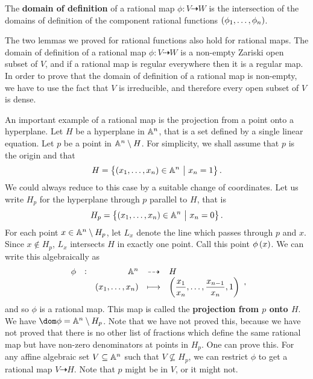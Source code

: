 \begin{definition*}
The \textbf{domain of definition} of a rational map $ \phi : V \dashrightarrow W $ is the intersection of the domains of definition of the component rational functions $ \br{\phi_1, \dots, \phi_n} $.
\end{definition*}

The two lemmas we proved for rational functions also hold for rational maps. The domain of definition of a rational map $ \phi : V \dashrightarrow W $ is a non-empty Zariski open subset of $ V $, and if a rational map is regular everywhere then it is a regular map. In order to prove that the domain of definition of a rational map is non-empty, we have to use the fact that $ V $ is irreducible, and therefore every open subset of $ V $ is dense.

\begin{example*}
An important example of a rational map is the projection from a point onto a hyperplane. Let $ H $ be a hyperplane in $ \AA^n $, that is a set defined by a single linear equation. Let $ p $ be a point in $ \AA^n \setminus H $. For simplicity, we shall assume that $ p $ is the origin and that
$$ H = \cbr{\br{x_1, \dots, x_n} \in \AA^n \st x_n = 1}. $$
We could always reduce to this case by a suitable change of coordinates. Let us write $ H_p $ for the hyperplane through $ p $ parallel to $ H $, that is
$$ H_p = \cbr{\br{x_1, \dots, x_n} \in \AA^n \st x_n = 0}. $$
For each point $ x \in \AA^n \setminus H_p $, let $ L_x $ denote the line which passes through $ p $ and $ x $. Since $ x \notin H_p $, $ L_x $ intersects $ H $ in exactly one point. Call this point $ \phi\br{x} $. We can write this algebraically as
$$
\begin{array}{ccrcl}
\phi & : & \AA^n & \dashrightarrow & H \\
& & \br{x_1, \dots, x_n} & \longmapsto & \br{\dfrac{x_1}{x_n}, \dots, \dfrac{x_{n - 1}}{x_n}, 1}
\end{array},
$$
and so $ \phi $ is a rational map. This map is called the \textbf{projection from $ p $ onto $ H $}. We have $ \dom \phi = \AA^n \setminus H_p $. Note that we have not proved this, because we have not proved that there is no other list of fractions which define the same rational map but have non-zero denominators at points in $ H_p $. One can prove this. For any affine algebraic set $ V \subseteq \AA^n $ such that $ V \not\subseteq H_p $, we can restrict $ \phi $ to get a rational map $ V \dashrightarrow H $. Note that $ p $ might be in $ V $, or it might not.
\end{example*}

